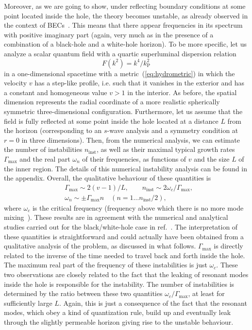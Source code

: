 \documentclass[11pt,a4paper]{article}
\begin{document}
Moreover, as we are going to show, under reflecting boundary conditions at some
point located inside the hole, the theory  becomes unstable, as already observed in the context of BECs~\cite{garay-PRA,cano-barcelo}. This means that there appear frequencies in its
spectrum with positive imaginary part (again, very much
as in the presence of a combination of a black-hole and a white-hole horizon). To be more specific, let us analyze a
scalar quantum field with a quartic superluminal dispersion relation 
%
\begin{equation}\label{eq:superluminal-dispersion}
F(k^2)= k^4/k_\text{P}^2
\end{equation}
%
in a one-dimensional spacetime with a metric~(\ref{eq:hydrometric}) 
in which the velocity $v$ has a step-like profile, 
i.e. such that it vanishes in the exterior and has a constant and homogeneous value $v>1$ in the interior. As before, the spatial dimension represents the radial coordinate of a more realistic spherically symmetric three-dimensional configuration. Furthermore, let us assume that the field is fully reflected at some point inside the hole
located at a distance $L$ from the horizon (corresponding to an $s$-wave analysis and a symmetry condition at
$r=0$ in three dimensions). Then, from the numerical analysis, we can estimate the
number of instabilities  $n_\text{inst}$, as well as
their maximal typical growth rates $\Gamma_\text{max}$ and the real part
$\omega_n$ of their  frequencies, as functions of $v$ and the size $L$ of
the inner region. The details of this numerical instability analysis can be found in the appendix.
Overall, the qualitative behaviour of these quantities is 
\begin{align}
&\Gamma_\text{max}\sim2 (v-1)/L,\qquad
n_\text{inst}\sim2\omega_c /\Gamma_\text{max},\\
&
\omega_n\sim\pm\Gamma_\text{max}n\quad (n=1\ldots n_\text{inst}/2),
\end{align}
where $\omega_c$ is the critical frequency (frequency above which there is no 
more mode mixing~\cite{macher-parentani}). These results are in agreement with the numerical and analytical studies carried out for the black/white-hole case in ref.~\cite{parentani-finazzi}. 
The interpretation of these quantities is straightforward and could actually
have been obtained from a qualitative analysis of the problem, as discussed in
what follows. $\Gamma_\text{max}$ is directly related to the inverse of the time
needed to travel back and forth inside the hole. The maximum real part of the
frequency of these instabilities is just $\omega_c$. These two observations are
closely related to  the fact that the leaking of resonant modes inside the hole
is responsible for  the instability. The number of instabilities is determined
by the ratio between these two quantities $\omega_c/\Gamma_\text{max}$, at least
for sufficiently large $L$. Again, this is just a consequence of the fact that
the resonant modes, which obey a kind of quantization rule, build up and
eventually leak through the slightly permeable horizon giving rise to the
unstable behaviour. 
\end{document}
